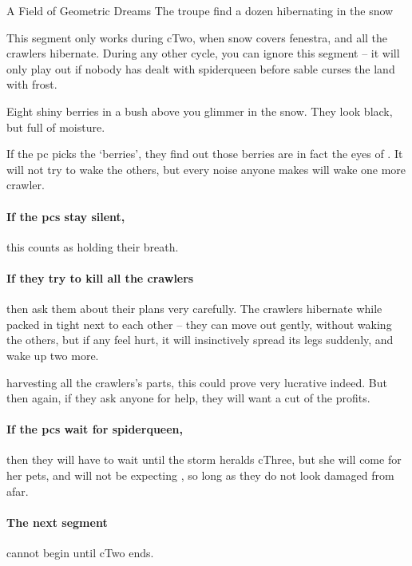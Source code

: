{A Field of Geometric Dreams}%
{The troupe find a dozen hibernating  in the snow}%
\label{spiderDreams}

This \gls{segment} only works during \gls{cTwo}, when \gls{snow} covers \gls{fenestra}, and all the \glspl{crawler} hibernate.
During any other \gls{cycle}, you can ignore this \gls{segment} -- it will only play out if nobody has dealt with \gls{spiderqueen} before \gls{sable} curses the land with frost.

\begin{boxtext}
	Eight shiny berries in a bush above you glimmer in the snow.
	They look black, but full of moisture.
\end{boxtext}

If the \gls{pc} picks the `berries', they find out those berries are in fact the eyes of .
It will not try to wake the others, but every noise anyone makes will wake one more \gls{crawler}.

\paragraph{If the \glspl{pc} stay silent,}
this counts as holding their breath.%

\paragraph{If they try to kill all the \glspl{crawler}}
then ask them about their plans very carefully.
The \glspl{crawler} hibernate while packed in tight next to each other -- they can move out gently, without waking the others, but if any feel hurt, it will insinctively spread its legs suddenly, and wake up two more.



\Gls{harvesting} all the \glspl{crawler}'s parts, this could prove very lucrative indeed.
But then again, if they ask anyone for help, they will want a cut of the profits.

\paragraph{If the \glspl{pc} wait for \gls{spiderqueen},}
then they will have to wait until the \gls{storm} heralds \gls{cThree}, but she will come for her pets, and will not be expecting , so long as they do not look damaged from afar.

\paragraph{The next \gls{segment}}
cannot begin until \gls{cTwo} ends.
